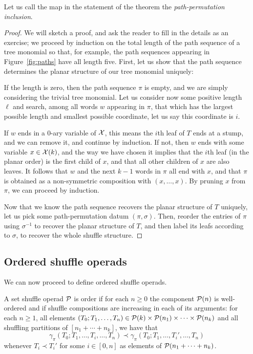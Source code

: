 Let us call the map in the statement of the theorem the
\emph{path-permutation inclusion}.

\begin{proof}
We will sketch a proof, and ask the reader to fill in the
details as an exercise; we proceed by induction on the
total length of the path sequence of a tree monomial so that,
for example, the path sequences appearing in Figure~\ref{fig:paths}
have all length five. First, let us show that the path sequence
determines the planar structure of our tree monomial uniquely:

If the length is zero, then the path sequence $\pi$
is empty, and we are simply considering the trivial tree monomial.
Let us consider now some positive length $\ell$ and search,
among all words $w$ appearing in $\pi$, that which has
the largest possible length and smallest possible coordinate,
let us say this coordinate is $i$.

If $w$ ends in a $0$-ary variable of $\mathcal{X}$, this means the
$i$th leaf of $T$ ends at a stump, and we can remove it, 
and continue by induction. If not, then $w$ ends with
some variable $x\in \mathcal{X}(k)$, and the way we have chosen
it implies that the $i$th leaf (in the planar order)
is the first child of $x$, and that all other children
of $x$ are also leaves. It follows that $w$
and the next $k-1$ words in $\pi$ all end with $x$,
and that $\pi$ is obtained as a non-symmetric composition
with $(x,\ldots,x)$. By pruning $x$ from $\pi$, we
can proceed by induction. 

Now that we know the path sequence recovers the planar structure
of $T$ uniquely, let us pick some path-permutation datum
$(\pi,\sigma)$. Then, reorder the entries of $\pi$ using
$\sigma^{-1}$ to recover the planar structure of $T$,
and then label its leafs according to $\sigma$, to 
recover the whole shuffle structure.
\end{proof}


\subsection{Ordered shuffle operads}

We can now proceed to define ordered shuffle operads. 

\begin{definition}
A set shuffle operad ${\mathcal{P}}$ is order if for each $n\geqslant 0$
the component ${\mathcal{P}}(n)$ is well-ordered and if shuffle compositions
are increasing in each of its arguments: for each $n\geqslant 1$,
all elements $(T_0;T_1,\ldots,T_n) \in{\mathcal{P}}(k)\times {\mathcal{P}}(n_1)
\times \cdots\times {\mathcal{P}}(n_k)$ and all shuffling partitions
of $[n_1+\cdots +n_k]$, we have that
\[ 
\gamma_\pi(T_0;T_1,\ldots,T_i, \ldots, T_n)  \prec
\gamma_\pi(T_0;T_1,\ldots,T_i',\ldots,T_n)
\]
whenever $T_i\prec T_i'$  for some $i\in [0,n]$ as elements
of ${\mathcal{P}}(n_1+\cdots+ n_k)$. 
\end{definition}


